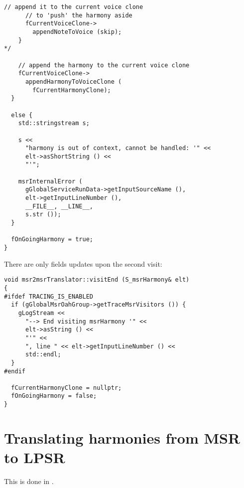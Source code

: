 \begin{lstlisting}[language=CPlusPlus]
      // append it to the current voice clone
      // to 'push' the harmony aside
      fCurrentVoiceClone->
        appendNoteToVoice (skip);
    }
*/

    // append the harmony to the current voice clone
    fCurrentVoiceClone->
      appendHarmonyToVoiceClone (
        fCurrentHarmonyClone);
  }

  else {
    std::stringstream s;

    s <<
      "harmony is out of context, cannot be handled: '" <<
      elt->asShortString () <<
      "'";

    msrInternalError (
      gGlobalServiceRunData->getInputSourceName (),
      elt->getInputLineNumber (),
      __FILE__, __LINE__,
      s.str ());
  }

  fOnGoingHarmony = true;
}
\end{lstlisting}

There are only fields updates upon the second visit:
\begin{lstlisting}[language=CPlusPlus]
void msr2msrTranslator::visitEnd (S_msrHarmony& elt)
{
#ifdef TRACING_IS_ENABLED
  if (gGlobalMsrOahGroup->getTraceMsrVisitors ()) {
    gLogStream <<
      "--> End visiting msrHarmony '" <<
      elt->asString () <<
      "'" <<
      ", line " << elt->getInputLineNumber () <<
      std::endl;
  }
#endif

  fCurrentHarmonyClone = nullptr;
  fOnGoingHarmony = false;
}
\end{lstlisting}


\section{Translating harmonies from MSR to LPSR}

This is done in \msrToLpsr{}.

